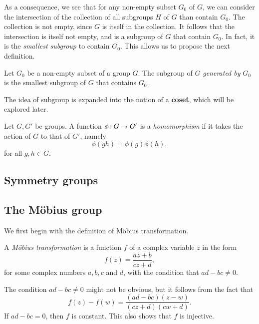 \documentclass[main.tex]{subfiles}
\begin{document}
			As a consequence, we see that for any non-empty subset $G_0$ of $G$, we can consider the intersection of the collection of all subgroups $H$ of $G$ than contain $G_0$. The collection is not empty, since $G$ is itself in the collection. It follows that the intersection is itself not empty, and is a subgroup of $G$ that contain $G_0$. In fact, it is the \textit{smallest subgroup} to contain $G_0$. This allows us to propose the next definition.
			
			\begin{definition}
				Let $G_0$ be a non-empty subset of a group $G$. The subgroup of $G$ \textit{generated by} $G_0$ is the smallest subgroup of $G$ that contains $G_0$.
			\end{definition}
			
			The idea of subgroup is expanded into the notion of a \textbf{coset}, which will be explored later.
		\begin{definition}
			Let $G, G'$ be groups. A function $\phi \colon G \rightarrow G'$ is a \textit{homomorphism} if it takes the action of $G$ to that of $G'$, namely
			\begin{equation*}
					\phi(gh) = \phi(g)\phi(h),
			\end{equation*}
			for all $g, h \in G$.
		\end{definition}
			
			
	\subsection{Symmetry groups}
		
	\subsection{The M\"obius group}
		We first begin with the definition of M\"obius transformation.
		\begin{definition}
			A \textit{M\"obius transformation} is a function $f$ of a complex variable $z$ in the form
			\begin{equation*}
				f(z) = \frac{az + b}{cz + d},
			\end{equation*}
			for some complex numbers $a, b, c$ and $d$, with the condition that $ad - bc \neq 0$.
		\end{definition}
		The condition $ad - bc \neq 0$ might not be obvious, but it follows from the fact that
		\begin{equation*}
			f(z) - f(w) = \frac{(ad - bc)(z - w)}{(cz+d)(cw + d)}.
		\end{equation*}
		If $ad - bc = 0$, then $f$ is constant. This also shows that $f$ is injective.
		
\end{document}
